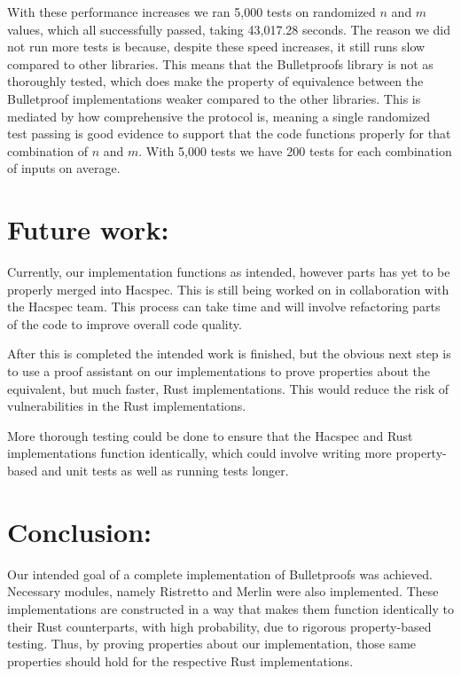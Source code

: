 \documentclass{article}
\begin{document}
With these performance increases we ran 5,000 tests on randomized
$n$ and $m$ values, which all successfully passed, taking 43,017.28
seconds. The reason we did not run more tests is because, despite these
speed increases, it still runs slow compared to other libraries. This
means that the Bulletproofs library is not as thoroughly tested,
which does make the property of equivalence between the Bulletproof
implementations weaker compared to the other libraries. This is mediated
by how comprehensive the protocol is, meaning a single randomized
test passing is good evidence to support that the code functions properly for
that combination of $n$ and $m$. With 5,000 tests we have 200 tests
for each combination of inputs on average.

\section{Future work:} \label{future-work}

Currently, our implementation functions as intended, however parts has
yet to be properly merged into Hacspec. This is still being worked on in
collaboration with the Hacspec team. This process can take time and will
involve refactoring parts of the code to improve overall code quality.

After this is completed the intended work is finished, but the obvious
next step is to use a proof assistant on our implementations to
prove properties about the equivalent, but much faster, Rust
implementations. This would reduce the risk of vulnerabilities in the
Rust implementations.

More thorough testing could be done to ensure that the Hacspec and
Rust implementations function identically, which could involve writing
more property-based and unit tests as well as running tests longer.

\section{Conclusion:} \label{conclusions}

Our intended goal of a complete implementation of Bulletproofs was
achieved. Necessary modules, namely Ristretto and Merlin were also
implemented. These implementations are constructed in a way that
makes them function identically to their Rust counterparts, with high
probability, due to rigorous property-based testing. Thus, by proving
properties about our implementation, those same properties should hold
for the respective Rust implementations.
\end{document}
